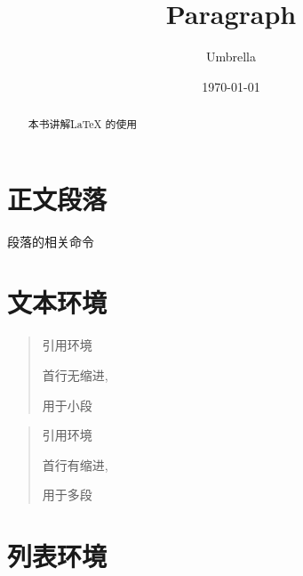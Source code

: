 \documentclass{ctexart}
\title{Paragraph}
\author{Umbrella}
\date{\today}
\theoremstyle{marginbreak}
\begin{document}
\maketitle
\tableofcontents	
\section{正文段落}

段落的相关命令




\section{文本环境}


\begin{quote}
引用环境

首行无缩进,\par
用于小段
\end{quote}

\begin{quotation}
引用环境

首行有缩进,\par
用于多段
\end{quotation}

\begin{abstract}
本书讲解\LaTeX{} 的使用
\end{abstract}

\section{列表环境}


\end{document}
